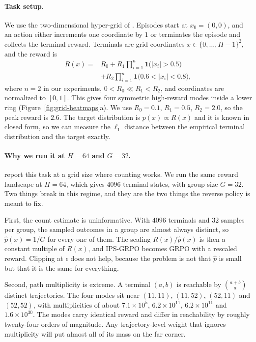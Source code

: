 \documentclass[11pt]{article}
\begin{document}
\paragraph{Task setup.}
We use the two-dimensional hyper-grid of \citet{sinha2026ips}. Episodes start at
$x_0 = (0,0)$, and an action either increments one coordinate by $1$ or
terminates the episode and collects the terminal reward. Terminals are grid
coordinates $x \in \{0,\dots,H-1\}^2$, and the reward is
\begin{equation}
\begin{aligned}
R(x) ={}& R_0 + R_1 \prod_{i=1}^{n}\mathbf{1}\bigl(|x_i| > 0.5\bigr) \\
        &+ R_2 \prod_{i=1}^{n}\mathbf{1}\bigl(0.6 < |x_i| < 0.8\bigr),
\end{aligned}
\label{eq:gridreward}
\end{equation}
where $n=2$ in our experiments, $0 < R_0 \ll R_1 < R_2$, and coordinates are
normalized to $[0,1]$. This gives
four symmetric high-reward modes inside a lower ring
(Figure~\ref{fig:grid-heatmaps}a). We use $R_0 = 0.1$, $R_1 = 0.5$,
$R_2 = 2.0$, so the peak reward is $2.6$. The target distribution is
$p(x) \propto R(x)$ and it is known in closed form, so we can measure the
$\ell_1$ distance between the empirical terminal distribution and the target
exactly.

\paragraph{Why we run it at $H=64$ and $G=32$.}
\citet{sinha2026ips} report this task at a grid size where counting works. We
run the same reward landscape at $H = 64$, which gives $4096$ terminal states,
with group size $G = 32$. Two things break in this regime, and they are the two
things the reverse policy is meant to fix.

First, the count estimate is uninformative. With $4096$ terminals and $32$
samples per group, the sampled outcomes in a group are almost always distinct,
so $\hat{p}(x) = 1/G$ for every one of them. The scaling $R(x)/\hat{p}(x)$ is
then a constant multiple of $R(x)$, and IPS-GRPO becomes GRPO with a rescaled
reward. Clipping at $\epsilon$ does not help, because the problem is not that
$\hat{p}$ is small but that it is the same for everything.

Second, path multiplicity is extreme. A terminal $(a,b)$ is reachable by
$\binom{a+b}{a}$ distinct trajectories. The four modes sit near $(11,11)$,
$(11,52)$, $(52,11)$ and $(52,52)$, with multiplicities of about
$7.1\times10^{5}$, $6.2\times10^{11}$, $6.2\times10^{11}$ and
$1.6\times10^{30}$. The modes carry identical reward and differ in reachability
by roughly twenty-four orders of magnitude. Any trajectory-level weight that
ignores multiplicity will put almost all of its mass on the far corner.
\end{document}
